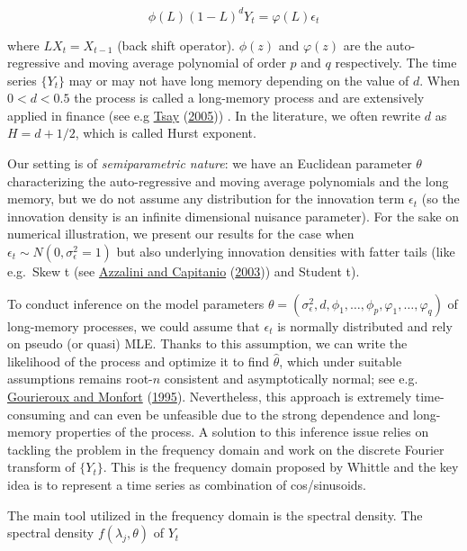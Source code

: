 \documentclass[
  11pt,
]{article}
\begin{document}
\[
\phi(L)(1-L)^{d} Y_{t}=\varphi(L) \epsilon_{t}
\]

where \(LX_t = X_{t-1}\) (back shift operator). \(\phi(z)\) and
\(\varphi(z)\) are the auto-regressive and moving average polynomial of
order \(p\) and \(q\) respectively. The time series \(\{Y_t\}\) may or
may not have long memory depending on the value of \(d\). When
\(0 < d < 0.5\) the process is called a long-memory process and are
extensively applied in finance (see e.g
\protect\hyperlink{ref-tsay2005analysis}{Tsay}
(\protect\hyperlink{ref-tsay2005analysis}{2005})) . In the literature,
we often rewrite \(d\) as \(H = d +1/2\), which is called Hurst
exponent.

Our setting is of \emph{semiparametric nature}: we have an Euclidean
parameter \(\theta\) characterizing the auto-regressive and moving
average polynomials and the long memory, but we do not assume any
distribution for the innovation term \(\epsilon_{t}\) (so the innovation
density is an infinite dimensional nuisance parameter). For the sake on
numerical illustration, we present our results for the case when
\(\epsilon_{t} \sim N\left(0, \sigma_{\epsilon}^{2}=1\right)\) but also
underlying innovation densities with fatter tails (like e.g.~Skew t (see
\protect\hyperlink{ref-azzalini2003distributions}{Azzalini and
Capitanio} (\protect\hyperlink{ref-azzalini2003distributions}{2003}))
and Student t).

To conduct inference on the model parameters
\(\theta=\left(\sigma_{\epsilon}^{2}, d, \phi_{1}, \ldots, \phi_{p}, \varphi_{1}, \ldots, \varphi_{q}\right)\)
of long-memory processes, we could assume that \(\epsilon_t\) is
normally distributed and rely on pseudo (or quasi) MLE. Thanks to this
assumption, we can write the likelihood of the process and optimize it
to find \(\hat \theta\), which under suitable assumptions remains
root-\(n\) consistent and asymptotically normal; see e.g.
\protect\hyperlink{ref-gourieroux1995statistics}{Gourieroux and Monfort}
(\protect\hyperlink{ref-gourieroux1995statistics}{1995}). Nevertheless,
this approach is extremely time-consuming and can even be unfeasible due
to the strong dependence and long-memory properties of the process. A
solution to this inference issue relies on tackling the problem in the
frequency domain and work on the discrete Fourier transform of
\(\{Y_t\}\). This is the frequency domain proposed by Whittle and the
key idea is to represent a time series as combination of cos/sinusoids.

The main tool utilized in the frequency domain is the spectral density.
The spectral density \(f(\lambda_j, \theta)\) of \(Y_t\)
\end{document}
